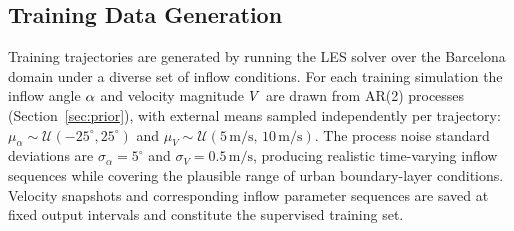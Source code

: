 \subsection{Training Data Generation}
\label{sec:data}

Training trajectories are generated by running the \palm{} LES solver
\cite{maronga2020} over the Barcelona domain under a diverse set of inflow
conditions. For each training simulation the inflow angle $\alpha$ and velocity
magnitude $V$ are drawn from AR(2) processes (Section~\ref{sec:prior}), with
external means sampled
independently per trajectory: $\mu_\alpha \sim \mathcal{U}(-25^\circ, 25^\circ)$
and $\mu_V \sim \mathcal{U}(5\,\mathrm{m/s},\,10\,\mathrm{m/s})$. The
process noise standard deviations are $\sigma_\alpha = 5^\circ$ and
$\sigma_V = 0.5\,\mathrm{m/s}$, producing realistic time-varying inflow
sequences while covering the plausible range of urban boundary-layer conditions.
Velocity snapshots and corresponding inflow parameter sequences are saved at
fixed output intervals and constitute the supervised training set.
